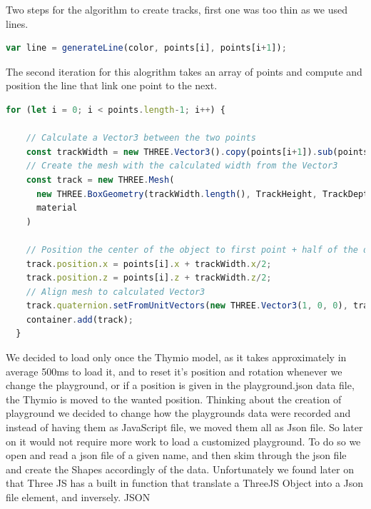 \documentclass{scrartcl}
\begin{document}
Two steps for the algorithm to create tracks, first one was too thin as we used lines.
\begin{lstlisting}[language=JavaScript, basicstyle=\ttfamily\small]
  var line = generateLine(color, points[i], points[i+1]);
\end{lstlisting} 
The second iteration for this alogrithm takes an array of points and compute and position the line that link one point to the next.
\begin{lstlisting}[language=JavaScript, basicstyle=\ttfamily\small]
  for (let i = 0; i < points.length-1; i++) {

    // Calculate a Vector3 between the two points
    const trackWidth = new THREE.Vector3().copy(points[i+1]).sub(points[i]);
    // Create the mesh with the calculated width from the Vector3
    const track = new THREE.Mesh(
      new THREE.BoxGeometry(trackWidth.length(), TrackHeight, TrackDepth),
      material
    )

    // Position the center of the object to first point + half of the distance between the points (for x and z)
    track.position.x = points[i].x + trackWidth.x/2;
    track.position.z = points[i].z + trackWidth.z/2;
    // Align mesh to calculated Vector3
    track.quaternion.setFromUnitVectors(new THREE.Vector3(1, 0, 0), trackWidth.clone().normalize());
    container.add(track);      
  }
\end{lstlisting} 

We decided to load only once the Thymio model, as it takes approximately in average 500ms to load it, and to reset it's position and rotation whenever we change the playground, or if a position is given in the playground.json data file, the Thymio is moved to the wanted position.
Thinking about the creation of playground we decided to change how the playgrounds data were recorded and instead of having them as JavaScript file, we moved them all as Json file. So later on it would not require more work to load a 
customized playground. To do so we open and read a json file of a given name, and then skim through the json file and create the Shapes accordingly of the data.
Unfortunately we found later on that Three JS has a built in function that translate a ThreeJS Object into a Json file element, and inversely.
JSON
\end{document}
